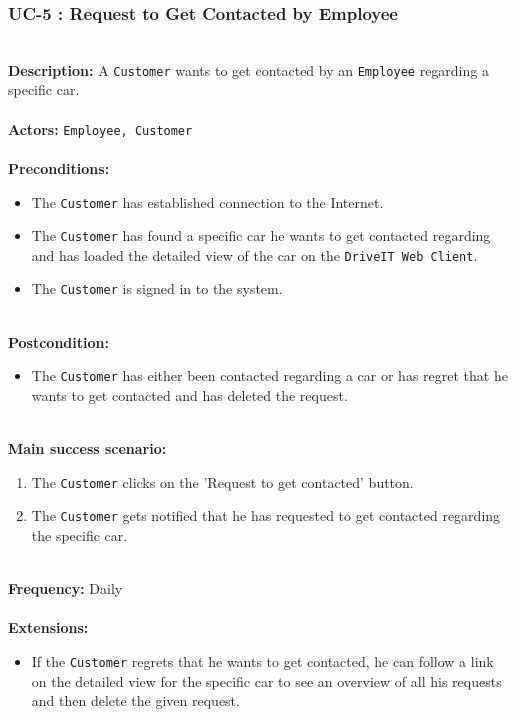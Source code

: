 \subsubsection{UC-5 : Request to Get Contacted by Employee}
\label{request-contact-use-case}
\HRule \\[0.4cm]
\textbf{Description:} A \texttt{Customer} wants to get contacted by an \texttt{Employee} regarding a specific car. \\
\HRule \\[0.4cm]
\textbf{Actors:} \texttt{Employee, Customer}\\
\HRule \\[0.4cm]
\textbf{Preconditions:} 
\begin{itemize}
    \item The \texttt{Customer} has established connection to the Internet.
    \item The \texttt{Customer} has found a specific car he wants to get contacted regarding and has loaded the detailed view of the car on the \texttt{DriveIT Web Client}.
    \item The \texttt{Customer} is signed in to the system.
\end{itemize}
\HRule \\[0.4cm]
\textbf{Postcondition:}
\begin{itemize}
    \item The \texttt{Customer} has either been contacted regarding a car or has regret that he wants to get contacted and has deleted the request.
\end{itemize}
\HRule \\[0.4cm]
\textbf{Main success scenario:}
\begin{enumerate}
    \item The \texttt{Customer} clicks on the 'Request to get contacted' button.
    \item The \texttt{Customer} gets notified that he has requested to get contacted regarding the specific car.
\end{enumerate}
\HRule \\[0.4cm]
\textbf{Frequency:}
Daily \\
\HRule \\[0.4cm]
\textbf{Extensions:}
\begin{itemize}
	\item If the \texttt{Customer} regrets that he wants to get contacted, he can follow a link on the detailed view for the specific car to see an overview of all his requests and then delete the given request.
\end{itemize}
\HRule \\[0.4cm]
